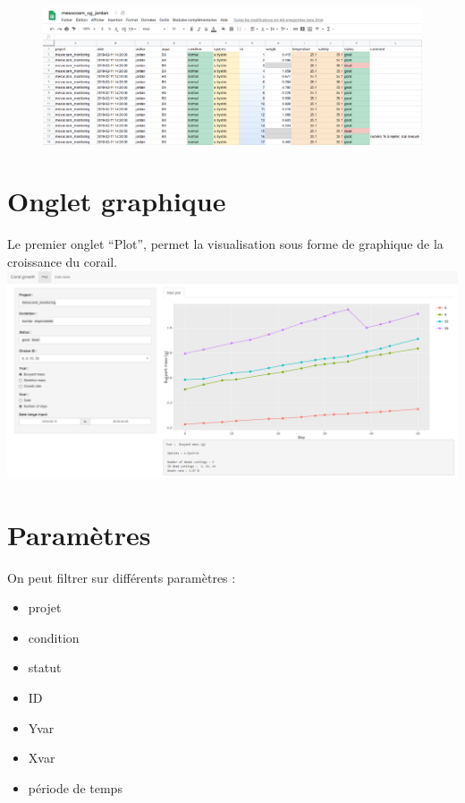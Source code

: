 \documentclass[]{book}
\providecommand{\tightlist}{%
  \setlength{\itemsep}{0pt}\setlength{\parskip}{0pt}}
\begin{document}
\begin{figure}
\centering
\includegraphics{image/notebook-googlesheets-presentation.png}
\caption{}
\end{figure}

\section{Onglet graphique}\label{onglet-graphique}

Le premier onglet ``Plot'', permet la visualisation sous forme de
graphique de la croissance du corail.
\includegraphics{image/notebook-plot1.png}

\section{Paramètres}\label{parametres}

On peut filtrer sur différents paramètres :

\begin{itemize}
\tightlist
\item
  projet
\item
  condition
\item
  statut
\item
  ID
\item
  Yvar
\item
  Xvar
\item
  période de temps
\end{itemize}
\end{document}
